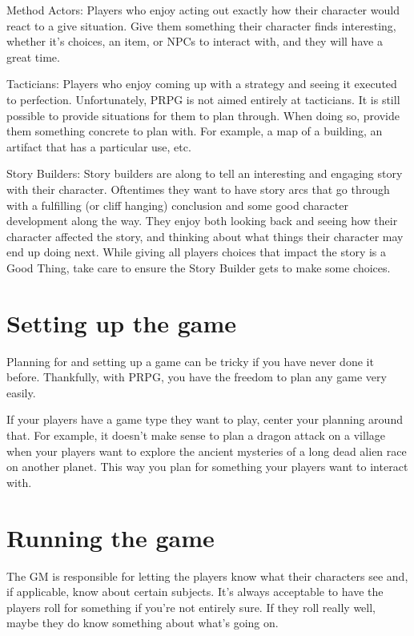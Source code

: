 \begin{flushleft}
Method Actors: Players who enjoy acting out exactly how their character would
react to a give situation. Give them something their character finds
interesting, whether it's choices, an item, or NPCs to interact with, and they
will have a great time.

Tacticians: Players who enjoy coming up with a strategy and seeing it executed
to perfection. Unfortunately, PRPG is not aimed entirely at tacticians. It is
still possible to provide situations for them to plan through. When doing so,
provide them something concrete to plan with. For example, a map of a building,
an artifact that has a particular use, etc.

Story Builders: Story builders are along to tell an interesting and engaging
story with their character. Oftentimes they want to have story arcs that
go through with a fulfilling (or cliff hanging) conclusion and some good
character development along the way. They enjoy both looking back and seeing how
their character affected the story, and thinking about what things their
character may end up doing next. While giving all players choices that impact
the story is a Good Thing, take care to ensure the Story Builder gets to make
some choices.

\section*{Setting up the game}

Planning for and setting up a game can be tricky if you have never done it
before. Thankfully, with PRPG, you have the freedom to plan any game very
easily.

If your players have a game type they want to play, center your planning around
that. For example, it doesn't make sense to plan a dragon attack on a village
when your players want to explore the ancient mysteries of a long dead alien
race on another planet. This way you plan for something your players want to
interact with.

\section*{Running the game}

The GM is responsible for letting the players know what their characters see
and, if applicable, know about certain subjects. It's always acceptable to
have the players roll for something if you're not entirely sure. If they roll
really well, maybe they do know something about what's going on.


\end{flushleft}
